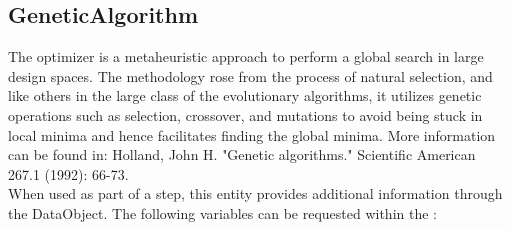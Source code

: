 \subsection{GeneticAlgorithm}
  The  optimizer is a metaheuristic approach
  to perform a global search in large design spaces. The methodology rose
  from the process of natural selection, and like others in the large class
  of the evolutionary algorithms, it utilizes genetic operations such as
  selection, crossover, and mutations to avoid being stuck in local minima
  and hence facilitates finding the global minima. More information can
  be found in:                             Holland, John H. "Genetic algorithms." Scientific
  American 267.1 (1992): 66-73.
\vspace{7pt} \\When used as part of a  step, this entity provides
        additional information through the  DataObject. The
        following variables can be requested within the :
